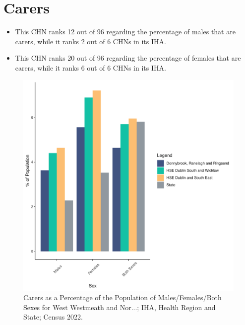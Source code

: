 \documentclass{article}
\begin{document}
\section{Carers}\label{sect:Carers}
\begin{itemize}
\item This CHN ranks  12 out of 96 regarding the percentage of males that are carers, while it ranks   2 out of 6 CHNs in its IHA.
\item This CHN ranks  20 out of 96 regarding the percentage of females that are carers, while it ranks   6 out of 6 CHNs in its IHA.
\end{itemize}
\begin{figure}[H]
	\centering
	\includegraphics[width = 150mm]{../figures/CareED.pdf}
	\caption{Carers as a Percentage of the Population of Males/Females/Both Sexes for West Westmeath and Nor...; IHA, Health Region and State; Census 2022.}
	\label{fig:2ae19629-1a6a-13a3-e055-000000000001}
	\end{figure}
\end{document}
